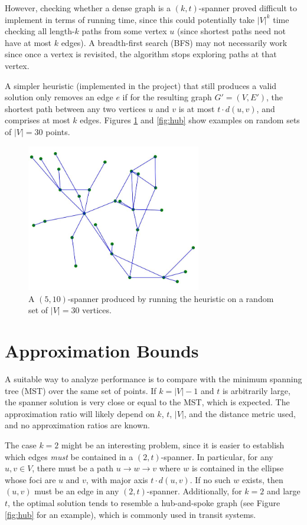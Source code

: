 \documentclass[12pt]{article}
\theoremstyle{definition}
\begin{document}
However, checking whether a dense graph is a $(k,t)$-spanner proved difficult to implement in terms of running time, since this could potentially take $|V|^k$ time checking all length-$k$ paths from some vertex $u$ (since shortest paths need not have at most $k$ edges). A breadth-first search (BFS) may not necessarily work since once a vertex is revisited, the algorithm stops exploring paths at that vertex.

A simpler heuristic (implemented in the project) that still produces a valid solution only removes an edge $e$ if for the resulting graph $G' = (V,E')$, the shortest path between any two vertices $u$ and $v$ is at most $t \cdot d(u,v)$, and comprises at most $k$ edges. Figures \ref{fig:example} and \ref{fig:hub} show examples on random sets of $|V| = 30$ points.

\begin{figure}[h]
\centering
\includegraphics[width=3in]{images/spanner}
\caption{A $(5,10)$-spanner produced by running the heuristic on a random set of $|V| = 30$ vertices.}
\label{fig:example}
\end{figure}

\section{Approximation Bounds}
A suitable way to analyze performance is to compare with the minimum spanning tree (MST) over the same set of points. If $k = |V|-1$ and $t$ is arbitrarily large, the spanner solution is very close or equal to the MST, which is expected. The approximation ratio will likely depend on $k$, $t$, $|V|$, and the distance metric used, and no approximation ratios are known.

The case $k = 2$ might be an interesting problem, since it is easier to establish which edges \emph{must} be contained in a $(2,t)$-spanner. In particular, for any $u, v \in V$, there must be a path $u \to w \to v$ where $w$ is contained in the ellipse whose foci are $u$ and $v$, with major axis $t \cdot d(u,v)$. If no such $w$ exists, then $(u,v)$ must be an edge in any $(2,t)$-spanner. Additionally, for $k = 2$ and large $t$, the optimal solution tends to resemble a hub-and-spoke graph (see Figure \ref{fig:hub} for an example), which is commonly used in transit systems.
\end{document}
